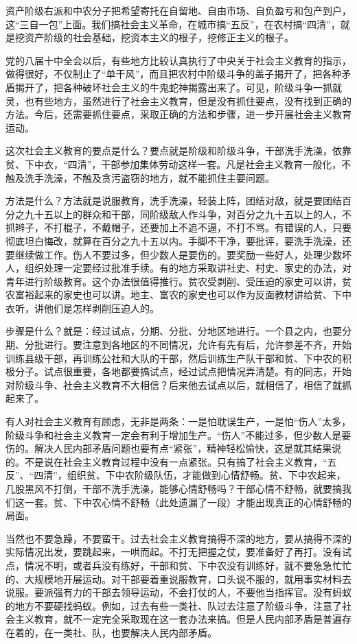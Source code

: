 资产阶级右派和中农分子把希望寄托在自留地、自由市场、自负盈亏和包产到户，这“三自一包”上面。我们搞社会主义革命，在城市搞“五反”，在农村搞“四清”，就是挖资产阶级的社会基础，挖资本主义的根子，挖修正主义的根子。

党的八届十中全会以后，有些地方比较认真执行了中央关于社会主义教育的指示，做得很好，不仅制止了“单干风”，而且把农村中阶级斗争的盖子揭开了，把各种矛盾揭开了，把各种破坏社会主义的牛鬼蛇神揭露出来了。可见，阶级斗争一抓就灵，也有些地方，虽然进行了社会主义教育，但是没有抓住要点，没有找到正确的方法。今后，还需要抓住要点，采取正确的方法和步骤，进一步开展社会主义教育运动。

这次社会主义教育的要点是什么？要点就是阶级和阶级斗争，干部洗手洗澡，依靠贫、下中衣，“四清”，干部参加集体劳动这样一套。凡是社会主义教育一般化，不触及洗手洗澡，不触及贪污盗窃的地方，就不能抓住主要问题。

方法是什么？方法就是说服教育，洗手洗澡，轻装上阵，团结对敌，就是要团结百分之九十五以上的群众和干部，同阶级敌人作斗争，对百分之九十五以上的人，不抓辫子，不打棍子，不戴帽子，还要加上不追不逼，不打不骂。有错误的人，只要彻底坦白悔改，就算在百分之九十五以内。手脚不干净，要批评，要洗手洗澡，还要继续做工作。伤人不要过多，但少数人是要伤的。要奖励一些好人，处理少数坏人，组织处理一定要经过批准手续。有的地方采取讲社史、村史、家史的办法，对青年进行阶级教育。这个办法很值得推行。贫农受剥削、受压迫的家史可以讲，贫农富裕起来的家史也可以讲。地主、富农的家史也可以作为反面教材讲给贫、下中衣听，讲他们是怎样剥削压迫人的。

步骤是什么？就是：经过试点，分期、分批、分地区地进行。一个县之内，也要分期、分批进行。要注意到各地区的不同情况，允许有先有后，允许参差不齐，开始训练县级干部，再训练公社和大队的干部，然后训练生产队干部和贫、下中农的积极分子。试点很重要，各地都要搞试点，经过试点把情况弄清楚。有的同志，开始对阶级斗争、社会主义教育不大相信？后来他去试点以后，就相信了，相信了就抓起来了。

有人对社会主义教育有顾虑，无非是两条：一是怕耽误生产，一是怕“伤人”太多，阶级斗争和社会主义教育一定会有利于增加生产。“伤人”不能过多，但少数人是要伤的。解决人民内部矛盾问题也要有点“紧张”，精神轻松愉快，这是就其结果说的。不是说在社会主义教育过程中没有一点紧张。只有搞了社会主义教育，“五反”、“四清”，组织贫、下中农阶级队伍，才能做到心情舒畅。贫、下中农起来，几股黑风不打倒，干部不洗手洗澡，能够心情舒畅吗？干部心情不舒畅，就要搞我们这一套。贫、下中农心情不舒畅（此处遗漏了一段）才能出现真正的心情舒畅的局面。

当然也不要急躁，不要蛮干。过去社会主义教育搞得不深的地方，要从搞得不深的实际情况出发，要跳起来，一哄而起。不打无把握之仗，要准备好了再打。没有试点，情况不明，或者兵没有练好，干部和贫、下中农没有训练好，就不要急急忙忙的、大规模地开展运动。对干部要着重说服教育，口头说不服的，就用事实材料去说服。要派强有力的干部去领导运动，不会打仗的人，不要他当指挥官。没有蚂蚁的地方不要硬找蚂蚁。例如，过去有些一类社、队过去注意了阶级斗争，注意了社会主义教育，就不一定完全采取现在这一套办法来搞。但是人民内部矛盾是普遍存在着的，在一类社、队，也要解决人民内部矛盾。

